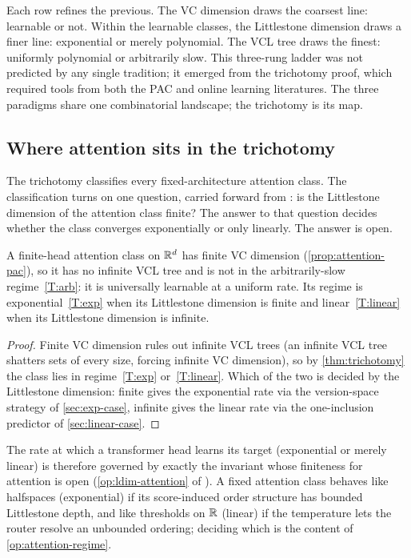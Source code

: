 Each row refines the previous.  The VC dimension draws the coarsest line:
learnable or not.  Within the learnable classes, the Littlestone dimension
draws a finer line: exponential or merely polynomial.  The VCL tree draws the
finest: uniformly polynomial or arbitrarily slow.  This three-rung ladder
was not predicted by any single tradition; it emerged from the trichotomy
proof, which required tools from both the PAC and online learning literatures.
The three paradigms share one combinatorial landscape; the trichotomy is its
map.


\subsection{Where attention sits in the trichotomy}
\label{sec:attention-trichotomy}

The trichotomy classifies every fixed-architecture attention class.
The classification turns on one question, carried forward from :
is the Littlestone dimension of the attention class finite?  The answer to
that question decides whether the class converges exponentially or only linearly.
The answer is open.

\begin{prop}
\label{prop:attention-trichotomy}
A finite-head attention class on $\mathbb{R}^d$ has finite VC dimension (\cref{prop:attention-pac}), so it has no infinite VCL tree and is not in the arbitrarily-slow regime~\ref{T:arb}: it is universally learnable at a uniform rate. Its regime is exponential~\ref{T:exp} when its Littlestone dimension is finite and linear~\ref{T:linear} when its Littlestone dimension is infinite.
\end{prop}

\begin{proof}
Finite VC dimension rules out infinite VCL trees (an infinite VCL tree shatters sets of every size, forcing infinite VC dimension), so by \cref{thm:trichotomy} the class lies in regime~\ref{T:exp} or~\ref{T:linear}.  Which of the two is decided by the Littlestone dimension: finite gives the exponential rate via the version-space strategy of \cref{sec:exp-case}, infinite gives the linear rate via the one-inclusion predictor of \cref{sec:linear-case}.
\end{proof}

The rate at which a transformer head learns its target (exponential or merely linear) is therefore governed by exactly the invariant whose finiteness for attention is open (\cref{op:ldim-attention} of ).  A fixed attention class behaves like halfspaces (exponential) if its score-induced order structure has bounded Littlestone depth, and like thresholds on $\mathbb{R}$ (linear) if the temperature lets the router resolve an unbounded ordering; deciding which is the content of \cref{op:attention-regime}.

